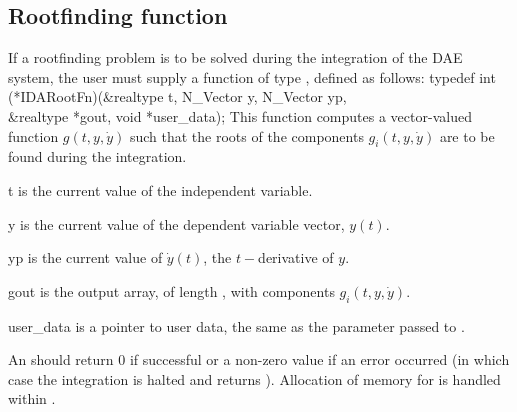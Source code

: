 {\subsection{Rootfinding function}
\label{ss:rootFn}
If a rootfinding problem is to be solved during the integration of the DAE system,
the user must supply a {\CC} function of type , defined as follows:
{
  typedef int (*IDARootFn)(&realtype t, N\_Vector y, N\_Vector yp, \\
                           &realtype *gout, void *user\_data);
}
{
  This function computes a vector-valued function $g(t,y,\dot{y})$ such that the
  roots of the  components $g_i(t,y,\dot{y})$ are to be found during
  the integration.
}
{
  \begin{args}
  \item[t]
    is the current value of the independent variable.
  \item[y]
    is the current value of the dependent variable vector, $y(t)$.
  \item[yp]
    is the current value of $\dot{y}(t)$, the $t-$derivative of $y$.
  \item[gout]
    is the output array, of length , with components $g_i(t,y,\dot{y})$.
  \item[user\_data]
    is a pointer to user data, the same as the 
    parameter passed to .
  \end{args}
}
{
  An  should return 0 if successful or a non-zero value if
  an error occurred (in which case the integration is halted and  returns
  ).
}
{
  Allocation of memory for  is handled within {\ida}.
}

}
